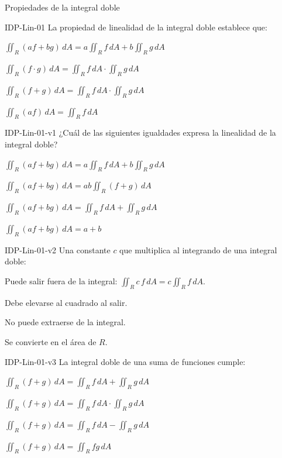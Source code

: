 \documentclass[a4,11pt]{aleph-notas}
\begin{document}
\begin{quiz}{Propiedades de la integral doble}

\begin{multi}[]%
    {IDP-Lin-01}
    La propiedad de linealidad de la integral doble establece que:
    \item* $\displaystyle\iint_R (af+bg)\,dA = a\iint_R f\,dA + b\iint_R g\,dA$
    \item $\displaystyle\iint_R (f\cdot g)\,dA = \iint_R f\,dA \cdot \iint_R g\,dA$
    \item $\displaystyle\iint_R (f+g)\,dA = \iint_R f\,dA \cdot \iint_R g\,dA$
    \item $\displaystyle\iint_R (af)\,dA = \iint_R f\,dA$
\end{multi}

\begin{multi}[]%
    {IDP-Lin-01-v1}
    ¿Cuál de las siguientes igualdades expresa la linealidad de la integral doble?
    \item* $\displaystyle\iint_R (af+bg)\,dA = a\iint_R f\,dA + b\iint_R g\,dA$
    \item $\displaystyle\iint_R (af+bg)\,dA = ab\iint_R (f+g)\,dA$
    \item $\displaystyle\iint_R (af+bg)\,dA = \iint_R f\,dA + \iint_R g\,dA$
    \item $\displaystyle\iint_R (af+bg)\,dA = a+b$
\end{multi}

\begin{multi}[]%
    {IDP-Lin-01-v2}
    Una constante $c$ que multiplica al integrando de una integral doble:
    \item* Puede salir fuera de la integral: $\displaystyle\iint_R c\,f\,dA = c\iint_R f\,dA$.
    \item Debe elevarse al cuadrado al salir.
    \item No puede extraerse de la integral.
    \item Se convierte en el área de $R$.
\end{multi}

\begin{multi}[]%
    {IDP-Lin-01-v3}
    La integral doble de una suma de funciones cumple:
    \item* $\displaystyle\iint_R (f+g)\,dA = \iint_R f\,dA + \iint_R g\,dA$
    \item $\displaystyle\iint_R (f+g)\,dA = \iint_R f\,dA \cdot \iint_R g\,dA$
    \item $\displaystyle\iint_R (f+g)\,dA = \iint_R f\,dA - \iint_R g\,dA$
    \item $\displaystyle\iint_R (f+g)\,dA = \iint_R fg\,dA$
\end{multi}


\end{quiz}
\end{document}
